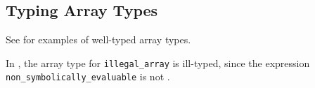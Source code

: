 \begin{mathpar}
\end{mathpar}
\subsection{Typing Array Types\label{sec:TypingArrayTypes}}
See  for examples of well-typed
array types.

In , the array type for \verb|illegal_array|
is ill-typed, since the expression \verb|non_symbolically_evaluable|
is not \symbolicallyevaluable{}.

